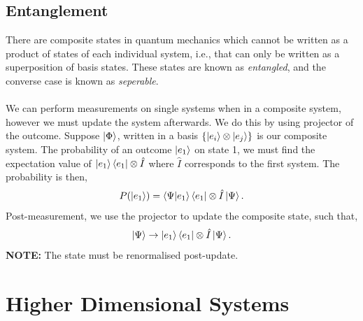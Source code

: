 \documentclass{book}
\begin{document}
\section{Entanglement}
There are composite states in quantum mechanics which cannot be written as a product of states of each individual system, i.e., that can only be written as a superposition of basis states. These states are known as \textit{entangled}, and the converse case is known as \textit{seperable}.
\\\\
We can perform measurements on single systems when in a composite system, however we must update the system afterwards. We do this by using projector of the outcome. Suppose $\ket{\Phi}$, written in a basis $\left\{\ket{e_i}\otimes\ket{e_j}\right\}$ is our composite system. The probability of an outcome $\ket{e_1}$ on state 1, we must find the expectation value of $\ket{e_1}\bra{e_1} \otimes \hat{I}$ where $\hat{I}$ corresponds to the first system. The probability is then,
\begin{equation}
	P(\ket{e_1}) = \bra{\Psi} \ket{e_1}\bra{e_1} \otimes \hat{I}\ket{\Psi}.
\end{equation}
Post-measurement, we use the projector to update the composite state, such that,
\begin{equation}
	\ket{\Psi} \to \ket{e_1}\bra{e_1}\otimes \hat{I}\ket{\Psi}.
\end{equation}
\textbf{NOTE:} The state must be renormalised post-update.
\chapter{Higher Dimensional Systems}
\end{document}

